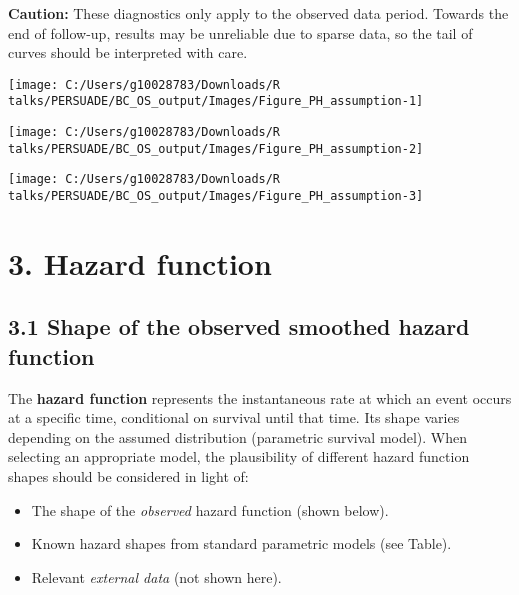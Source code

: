 \documentclass[
]{article}
\providecommand{\tightlist}{%
  \setlength{\itemsep}{0pt}\setlength{\parskip}{0pt}}
\begin{document}
\textbf{Caution:} These diagnostics only apply to the observed data
period. Towards the end of follow-up, results may be unreliable due to
sparse data, so the tail of curves should be interpreted with care.

\clearpage

\begin{flushleft}\texttt{[image: C:/Users/g10028783/Downloads/R talks/PERSUADE/BC\_OS\_output/Images/Figure\_PH\_assumption-1]} \end{flushleft}

\begin{flushleft}\texttt{[image: C:/Users/g10028783/Downloads/R talks/PERSUADE/BC\_OS\_output/Images/Figure\_PH\_assumption-2]} \end{flushleft}

\begin{flushleft}\texttt{[image: C:/Users/g10028783/Downloads/R talks/PERSUADE/BC\_OS\_output/Images/Figure\_PH\_assumption-3]} \end{flushleft}

\clearpage

\section{3. Hazard function}\label{hazard-function}

\subsection{3.1 Shape of the observed smoothed hazard
function}\label{shape-of-the-observed-smoothed-hazard-function}

The \textbf{hazard function} represents the instantaneous rate at which
an event occurs at a specific time, conditional on survival until that
time. Its shape varies depending on the assumed distribution (parametric
survival model). When selecting an appropriate model, the plausibility
of different hazard function shapes should be considered in light of:

\begin{itemize}
\tightlist
\item
  The shape of the \emph{observed} hazard function (shown below).
\item
  Known hazard shapes from standard parametric models (see Table).
\item
  Relevant \emph{external data} (not shown here).
\end{itemize}
\end{document}
